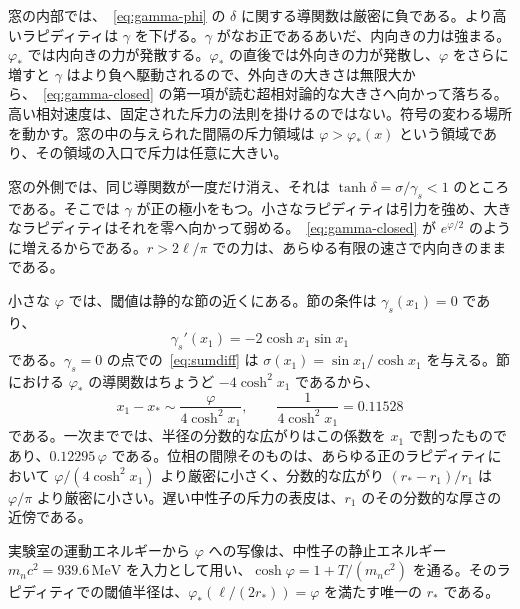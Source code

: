 \documentclass[a4paper]{article}
\begin{document}
窓の内部では、~\eqref{eq:gamma-phi} の \(\delta\) に関する導関数は厳密に負である。より高いラピディティは \(\gamma\) を下げる。\(\gamma\) がなお正であるあいだ、内向きの力は強まる。\(\varphi_*\) では内向きの力が発散する。\(\varphi_*\) の直後では外向きの力が発散し、\(\varphi\) をさらに増すと \(\gamma\) はより負へ駆動されるので、外向きの大きさは無限大から、~\eqref{eq:gamma-closed} の第一項が読む超相対論的な大きさへ向かって落ちる。高い相対速度は、固定された斥力の法則を掛けるのではない。符号の変わる場所を動かす。窓の中の与えられた間隔の斥力領域は \(\varphi>\varphi_*(x)\) という領域であり、その領域の入口で斥力は任意に大きい。

窓の外側では、同じ導関数が一度だけ消え、それは \(\tanh\delta=\sigma/\gamma_s<1\) のところである。そこでは \(\gamma\) が正の極小をもつ。小さなラピディティは引力を強め、大きなラピディティはそれを零へ向かって弱める。~\eqref{eq:gamma-closed} が \(e^{\varphi/2}\) のように増えるからである。\(r>2\ell/\pi\) での力は、あらゆる有限の速さで内向きのままである。

小さな \(\varphi\) では、閾値は静的な節の近くにある。節の条件は \(\gamma_s(x_1)=0\) であり、
\[
\gamma_s'(x_1)=-2\cosh x_1\sin x_1
\]
である。\(\gamma_s=0\) の点での~\eqref{eq:sumdiff} は \(\sigma(x_1)=\sin x_1/\cosh x_1\) を与える。節における \(\varphi_*\) の導関数はちょうど \(-4\cosh^{2}x_1\) であるから、
\begin{equation}
\label{eq:skin}
x_1-x_*
  \sim
  \frac{\varphi}{4\cosh^{2}x_1},
\qquad
\frac{1}{4\cosh^{2}x_1}=0.11528
\end{equation}
である。一次まででは、半径の分数的な広がりはこの係数を \(x_1\) で割ったものであり、\(0.12295\,\varphi\) である。位相の間隙そのものは、あらゆる正のラピディティにおいて \(\varphi/(4\cosh^{2}x_{1})\) より厳密に小さく、分数的な広がり \((r_{*}-r_{1})/r_{1}\) は \(\varphi/\pi\) より厳密に小さい。遅い中性子の斥力の表皮は、\(r_1\) のその分数的な厚さの近傍である。

実験室の運動エネルギーから \(\varphi\) への写像は、中性子の静止エネルギー \(m_n c^{2}=939.6\,\mathrm{MeV}\) を入力として用い、\(\cosh\varphi=1+T/(m_n c^{2})\) を通る。そのラピディティでの閾値半径は、\(\varphi_*(\ell/(2r_*))=\varphi\) を満たす唯一の \(r_*\) である。
\end{document}
